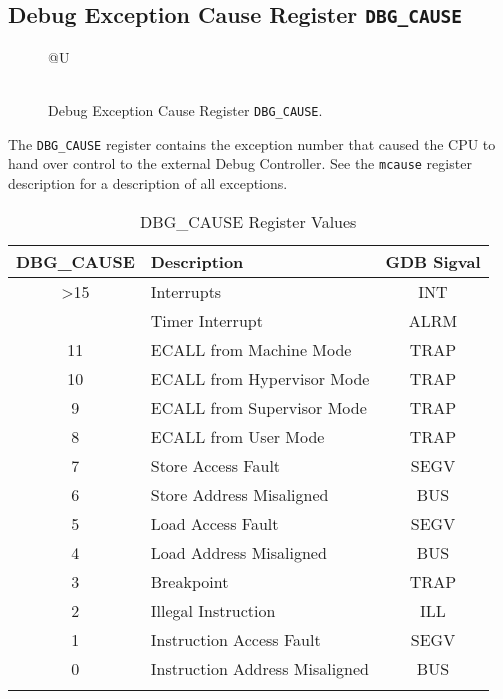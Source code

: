 \subsection{Debug Exception Cause Register
\texttt{DBG\_CAUSE}}\label{debug-exception-cause-register-dbg_cause}

\ifdefined\MARKDOWN
\else

\begin{figure*}[h!]
	{\footnotesize
		\begin{center}
			\begin{tabular}{@{}U}
				 \\
				\hline
				  \\
				\hline
			\end{tabular}
		\end{center}
	}
	\vspace{-0.1in}
	\caption{Debug Exception Cause Register \texttt{DBG\_CAUSE}.}
	\label{fig:dbgcausereg}
\end{figure*}

\fi

The \texttt{DBG\_CAUSE} register contains the exception number that caused the
CPU to hand over control to the external Debug Controller. See the
\texttt{mcause} register description for a description of all exceptions.

\begin{longtable}[]{@{}clc@{}}
	\toprule
	\textbf{DBG\_CAUSE} & \textbf{Description}           & \textbf{GDB Sigval}\tabularnewline
	\midrule
	\endhead
	\textgreater{}15    & Interrupts                     & INT\tabularnewline
	                    & Timer Interrupt                & ALRM\tabularnewline
	11                  & ECALL from Machine Mode        & TRAP\tabularnewline
	10                  & ECALL from Hypervisor Mode     & TRAP\tabularnewline
	9                   & ECALL from Supervisor Mode     & TRAP\tabularnewline
	8                   & ECALL from User Mode           & TRAP\tabularnewline
	7                   & Store Access Fault             & SEGV\tabularnewline
	6                   & Store Address Misaligned       & BUS\tabularnewline
	5                   & Load Access Fault              & SEGV\tabularnewline
	4                   & Load Address Misaligned        & BUS\tabularnewline
	3                   & Breakpoint                     & TRAP\tabularnewline
	2                   & Illegal Instruction            & ILL\tabularnewline
	1                   & Instruction Access Fault       & SEGV\tabularnewline
	0                   & Instruction Address Misaligned & BUS\tabularnewline
	\bottomrule
	\caption{DBG\_CAUSE Register Values}
\end{longtable}

